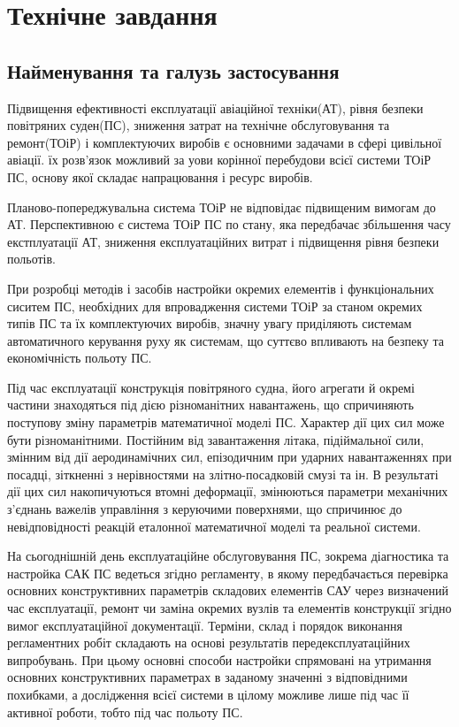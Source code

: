 \documentclass[ukrainian,utf8]{eskdtext}
\begin{document}
 
\section*{Технічне завдання}

\subsection*{Найменування та галузь застосування}
Підвищення ефективності експлуатації авіаційної техніки(АТ), 
рівня безпеки повітряних суден(ПС), зниження затрат на технічне 
обслуговування та ремонт(ТОіР) і комплектуючих виробів є 
основними задачами в сфері цивільної авіації. їх розв'язок 
можливий за уови корінної перебудови всієї системи ТОіР ПС, 
основу якої складає напрацювання і ресурс виробів.

Планово-попереджувальна система ТОіР не відповідає підвищеним 
вимогам до АТ. Перспективною є система ТОіР ПС по стану, яка 
передбачає збільшення часу екстплуатації АТ, зниження 
експлуатаційних витрат і підвищення рівня безпеки польотів.

При розробці методів і засобів настройки окремих елементів і 
функціональних сиситем ПС, необхідних для впровадження системи 
ТОіР за станом окремих типів ПС та їх комплектуючих виробів, 
значну увагу приділяють системам автоматичного керування руху 
як системам, що суттєво впливають на безпеку та економічність 
польоту ПС.

Під час експлуатації конструкція повітряного судна, його 
агрегати й окремі частини знаходяться під дією різноманітних 
навантажень, що спричиняють поступову зміну параметрів 
математичної моделі ПС.  Характер дії цих сил може бути 
різноманітними. Постійним від завантаження літака, підіймальної 
сили, змінним від дії аеродинамічних сил, епізодичним при 
ударних навантаженнях при посадці, зіткненні з нерівностями на 
злітно-посадковій смузі та ін. В результаті дії цих сил 
накопичуються втомні деформації, змінюються параметри механічних 
з'єднань важелів управління з керуючими поверхнями, що спричинює 
до невідповідності реакцій еталонної математичної моделі та 
реальної системи.

На сьогоднішній день експлуатаційне обслуговування ПС, зокрема 
діагностика та настройка САК ПС ведеться згідно регламенту, в 
якому передбачається перевірка основних конструктивних параметрів 
складових елементів САУ через визначений час експлуатації, ремонт 
чи заміна окремих вузлів та елементів конструкції згідно вимог 
експлуатаційної документації. Терміни, склад і порядок виконання 
регламентних робіт складають на основі результатів 
передексплуатаційних випробувань. При цьому основні способи 
настройки спрямовані на утримання основних конструктивних 
параметрах в заданому значенні з відповідними похибками, а 
дослідження всієї системи в цілому можливе лише під час її 
активної роботи, тобто під час польоту ПС.
\end{document}
